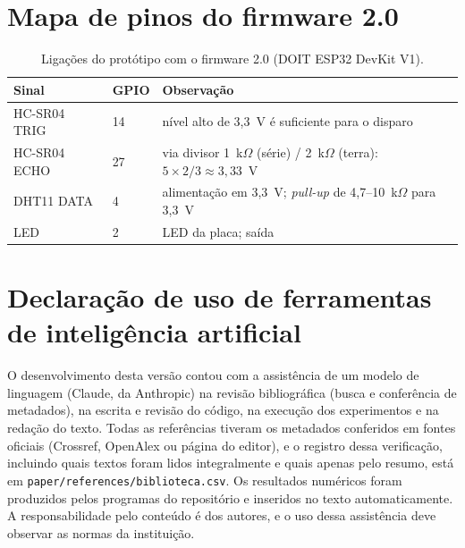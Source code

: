 \section{Mapa de pinos do firmware 2.0}\label{ap:pinos}

\begin{table}[ht]
\centering
\caption{Ligações do protótipo com o firmware 2.0 (DOIT ESP32 DevKit V1).}
\footnotesize
\begin{tabular}{@{}lll@{}}
\toprule
Sinal & GPIO & Observação \\
\midrule
HC-SR04 TRIG & 14 & nível alto de 3,3~V é suficiente para o disparo \\
HC-SR04 ECHO & 27 & via divisor 1~k$\Omega$ (série) / 2~k$\Omega$ (terra): $5 \times 2/3 \approx 3{,}33$~V \\
DHT11 DATA & 4 & alimentação em 3,3~V; \emph{pull-up} de 4,7--10~k$\Omega$ para 3,3~V \\
LED & 2 & LED da placa; saída \\
\bottomrule
\end{tabular}
\end{table}

\section{Declaração de uso de ferramentas de inteligência artificial}\label{ap:ia}

O desenvolvimento desta versão contou com a assistência de um modelo de
linguagem (Claude, da Anthropic) na revisão bibliográfica (busca e conferência
de metadados), na escrita e revisão do código, na execução dos experimentos e
na redação do texto. Todas as referências tiveram os metadados conferidos em
fontes oficiais (Crossref, OpenAlex ou página do editor), e o registro dessa
verificação, incluindo quais textos foram lidos integralmente e quais apenas
pelo resumo, está em \texttt{paper/references/biblioteca.csv}. Os resultados
numéricos foram produzidos pelos programas do repositório e inseridos no texto
automaticamente. A responsabilidade pelo conteúdo é dos autores, e o uso dessa
assistência deve observar as normas da instituição.
